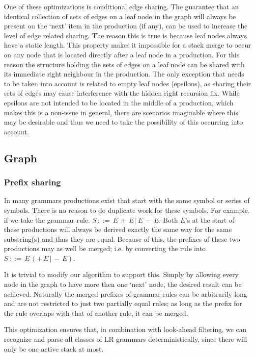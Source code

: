 \documentclass[a4paper,10pt]{article}
\begin{document}
One of these optimizations is conditional edge sharing. The guarantee that an identical collection of sets of edges on a leaf node in the graph will always be present on the `next' item in the production (if any), can be used to increase the level of edge related sharing. The reason this is true is because leaf nodes always have a static length. This property makes it impossible for a stack merge to occur on any node that is located directly after a leaf node in a production. For this reason the structure holding the sets of edges on a leaf node can be shared with its immediate right neighbour in the production. The only exception that needs to be taken into account is related to empty leaf nodes (epsilons), as sharing their sets of edges may cause interference with the hidden right recursion fix. While epsilons are not intended to be located in the middle of a production, which makes this is a non-issue in general, there are scenarios imaginable where this may be desirable and thus we need to take the possibility of this occurring into account.

\subsection{Graph}

\subsubsection{Prefix sharing}
\label{sec:prefixSharing}
In many grammars productions exist that start with the same symbol or series of symbols. There is no reason to do duplicate work for these symbols. For example, if we take the grammar rule: $S\,::=\,E\,+\,E\,|\,E\,-\,E$. Both $E$'s at the start of these productions will always be derived exactly the same way for the same substring(s) and thus they are equal. Because of this, the prefixes of these two productions may as well be merged; i.e. by converting the rule into $S\,::=\,E\,(+\,E\,|\,-\,E)$.

It is trivial to modify our algorithm to support this. Simply by allowing every node in the graph to have more then one `next' node, the desired result can be achieved. Naturally the merged prefixes of grammar rules can be arbitrarily long and are not restricted to just two partially equal rules; as long as the prefix for the rule overlaps with that of another rule, it can be merged.

This optimization ensures that, in combination with look-ahead filtering, we can recognize and parse all classes of LR grammars deterministically, since there will only be one active stack at most.
\end{document}
